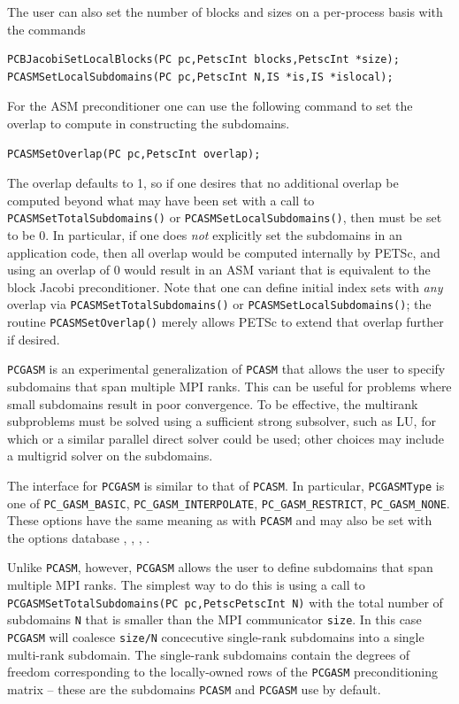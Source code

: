 The user can also set the number of blocks and sizes on a per-process
basis with the commands
\begin{lstlisting}
PCBJacobiSetLocalBlocks(PC pc,PetscInt blocks,PetscInt *size);
PCASMSetLocalSubdomains(PC pc,PetscInt N,IS *is,IS *islocal);
\end{lstlisting}

For the ASM preconditioner one can use the following command to set
the overlap to compute in constructing the subdomains.
\begin{lstlisting}
PCASMSetOverlap(PC pc,PetscInt overlap);
\end{lstlisting}
The overlap defaults to 1, so if one desires that no additional
overlap be computed beyond what may have been set with a call to \lstinline{PCASMSetTotalSubdomains()} or \lstinline{PCASMSetLocalSubdomains()}, then
 must be set to be 0.  In particular, if one does {\em
not} explicitly set the subdomains in an application code, then all
overlap would be computed internally by PETSc, and using an overlap of
0 would result in an ASM variant that is equivalent to the block
Jacobi preconditioner.  Note that one can define initial index sets
 with {\em any} overlap via \lstinline{PCASMSetTotalSubdomains()} or
\lstinline{PCASMSetLocalSubdomains()}; the routine \lstinline{PCASMSetOverlap()}
merely allows PETSc to extend that overlap further if desired.

\lstinline{PCGASM} is an experimental generalization of \lstinline{PCASM} that allows the user to specify subdomains
that span multiple MPI ranks.  This can be useful for problems where small subdomains result
in poor convergence.  To be effective, the multirank subproblems must be solved using a sufficient
strong subsolver, such as LU, for which  or a similar parallel
direct solver could be used; other choices may include a multigrid solver on the subdomains.

The interface for \lstinline{PCGASM} is similar to that of \lstinline{PCASM}. In particular,
\lstinline{PCGASMType} is one of \lstinline{PC_GASM_BASIC},
\lstinline{PC_GASM_INTERPOLATE}, \lstinline{PC_GASM_RESTRICT}, \lstinline{PC_GASM_NONE}.
These options have the same meaning as with \lstinline{PCASM}
and may also be set with the options database
 \trl{[basic}, , , \trl{none]}.
  
  

Unlike \lstinline{PCASM}, however, \lstinline{PCGASM} allows the user to define subdomains that span multiple MPI ranks.
The simplest way to do this is using a call to \lstinline{PCGASMSetTotalSubdomains(PC pc,PetscPetscInt N)} with the
total number of subdomains \lstinline{N} that is smaller than the MPI communicator \lstinline{size}. In this case
\lstinline{PCGASM} will coalesce \lstinline{size/N} concecutive single-rank subdomains into a single multi-rank subdomain.
The single-rank subdomains contain the degrees of freedom corresponding to the locally-owned rows of the
\lstinline{PCGASM} preconditioning matrix -- these are the subdomains \lstinline{PCASM} and \lstinline{PCGASM} use by default.

